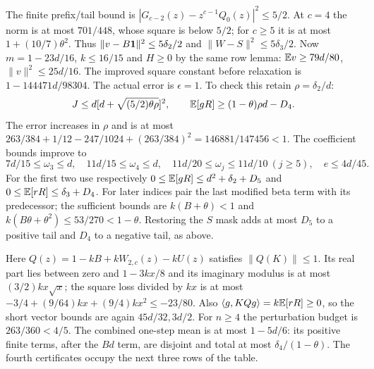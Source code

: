 The finite prefix/tail bound is
$|G_{c-2}(z)-z^{c-1}Q_0(z)|^2\le5/2$.
At $c=4$ the norm is at most $701/448$, whose square is below $5/2$;
for $c\ge5$ it is at most $1+(10/7)\theta^2$.
Thus $\|v-B\mathbf1\|^2\le5\delta_{2}/2$ and $\|W-S\|^2\le5\delta_{3}/2$.
Now $m=1-23d/16$, $k\le16/15$ and $H\ge0$ by the same row lemma:
$\mathbb E v\ge79d/80$, $\|v\|^2\le25d/16$.
The improved square constant before relaxation is $1-144471d/98304$.
The actual error is $\epsilon=1$.
To check this retain $\rho=\delta_{2}/d$:
\[
 J\le d[d+\sqrt{(5/2)\theta\rho}]^2,\qquad
 \mathbb E[gR]\ge(1-\theta)\rho d-D_4.
\]
The error increases in $\rho$ and is at most
$263/384+1/12-247/1024+(263/384)^2=146881/147456<1$.
The coefficient bounds improve to
\[
 7d/15\le\omega_3\le d,\quad11d/15\le\omega_4\le d,
 \quad11d/20\le\omega_j\le11d/10\ (j\ge5),\quad e\le4d/45.
\]
For the first two use respectively
$0\le\mathbb E[gR]\le d^2+\delta_{2}+D_5$ and
$0\le\mathbb E[rR]\le \delta_{3}+D_4$.
For later indices pair the last modified beta term with its predecessor;
the sufficient bounds are $k(B+\theta)<1$ and
$k(B\theta+\theta^2)\le53/270<1-\theta$.
Restoring the $S$ mask adds at most $D_5$ to a positive tail and
$D_4$ to a negative tail, as above.

Here $Q(z)=1-kB+kW_{2,c}(z)-kU(z)$ satisfies $\|Q(K)\|\le1$.
Its real part lies between zero and $1-3kx/8$ and its imaginary
modulus is at most $(3/2)kx\sqrt x$; the square loss divided by $kx$
is at most $-3/4+(9/64)kx+(9/4)kx^2\le-23/80$.
Also $\langle g,KQg\rangle=k\mathbb E[rR]\ge0$, so the short vector bounds
are again $45d/32,3d/2$.
For $n\ge4$ the perturbation budget is $263/360<4/5$.
The combined one-step mean is at most $1-5d/6$:
its positive finite terms, after the $Bd$ term, are disjoint and total
at most $\delta_{4}/(1-\theta)$.
The fourth certificates occupy the next three rows of the table.

